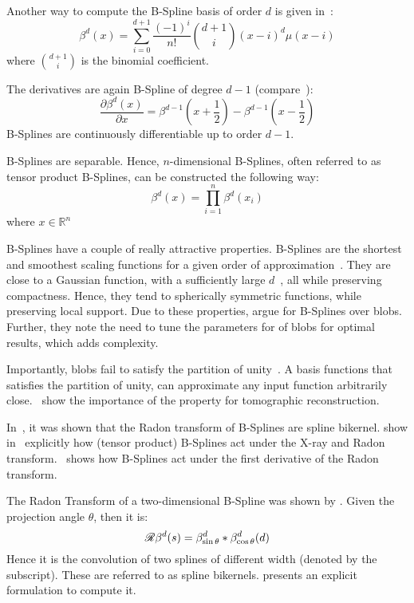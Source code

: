Another way to compute the B-Spline basis of order \(d\) is given in~\cite{unser_fast_1991}:
\begin{equation}
	\beta^d(x) = \sum_{i=0}^{d+1} \frac{(-1)^i}{n!} \binom{d+1}{i}(x - i)^d\mu(x - i)
\end{equation}
where \(\binom{d+1}{i}\) is the binomial coefficient.

The derivatives are again B-Spline of degree \(d-1\) (compare~\cite{unser_splines_1999}):
\begin{equation}
	\frac{\partial \beta^d(x)}{\partial x} = \beta^{d-1}\left(x + \frac{1}{2}\right) -
	\beta^{d-1}\left(x - \frac{1}{2}\right)
\end{equation}
B-Splines are continuously differentiable up to order \(d-1\).

B-Splines are separable. Hence, \(n\)-dimensional B-Splines, often referred to as tensor product
B-Splines, can be constructed the following way:
\begin{equation}
	\beta^d(x) = \prod^n_{i=1} \beta^d(x_i)
\end{equation}
where \(x \in \mathbb{R}^n\)

B-Splines have a couple of really attractive properties. B-Splines are the shortest and smoothest
scaling functions for a given order of approximation~\cite{momey_b-spline_2012}. They are close to a
Gaussian function, with a sufficiently large $d$~\cite{momey_b-spline_2012}, all while preserving
compactness. Hence, they tend to spherically symmetric functions, while preserving local support.
Due to these properties, \citeauthor*{momey_new_2011}\cite{momey_new_2011} argue for B-Splines over
blobs. Further, they note the need to tune the parameters for of blobs for optimal results, which
adds complexity.

Importantly, blobs fail to satisfy the partition of unity~\cite{nilchian_fast_2013}. A basis
functions that satisfies the partition of unity, can approximate any input function arbitrarily
close.~\cite{nilchian_fast_2013} show the importance of the property for tomographic reconstruction.

In~\cite{horbelt_discretization_2002}, it was shown that the Radon transform of B-Splines are spline
bikernel. \citeauthor*{entezari_box_2012} show in~\cite{entezari_box_2012} explicitly how (tensor
product) B-Splines act under the X-ray and Radon transform.~\cite{nilchian_differential_2012} shows
how B-Splines act under the first derivative of the Radon transform.

The Radon Transform of a two-dimensional B-Spline was shown by
\citeauthor*{horbelt_discretization_2002}\cite{horbelt_discretization_2002}. Given the projection
angle \(\theta\), then it is:
\begin{equation}
	\mathscr{R}\beta^d(s) = \beta^d_{\sin\theta} * \beta^d_{\cos\theta}(d)
\end{equation}
Hence it is the convolution of two splines of different width (denoted by the subscript). These are
referred to as spline bikernels. \citeauthor*{horbelt_discretization_2002} presents an explicit
formulation to compute it.


